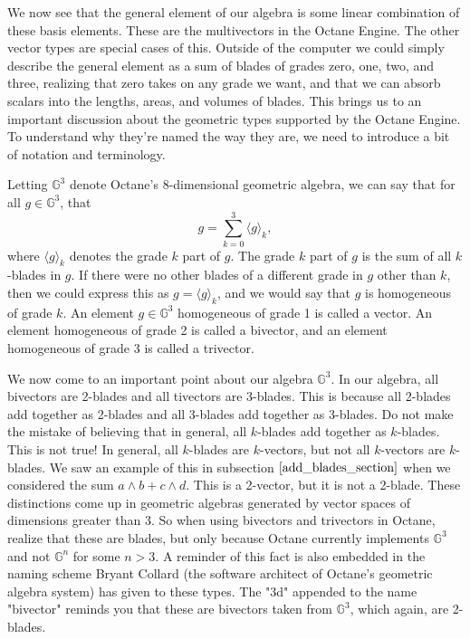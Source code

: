 \documentclass{article}
\newcommand{\G}{\mathbb{G}}
\begin{document}
We now see that the general element of our algebra is some linear combination
of these basis elements.  These are the multivectors in the Octane Engine.
The other vector types are special cases of this.
Outside of the computer we could simply describe the general element as
a sum of blades of grades zero, one, two, and three, realizing that zero takes
on any grade we want, and that we can absorb scalars into the lengths, areas,
and volumes of blades.  This brings us to an important discussion about the
geometric types supported by the Octane Engine.  To understand why they're named
the way they are, we need to introduce a bit of notation and terminology.

Letting $\G^3$ denote Octane's 8-dimensional geometric algebra, we can say
that for all $g\in\G^3$, that
\begin{equation*}
g = \sum_{k=0}^3\langle g\rangle_k,
\end{equation*}
where $\langle g\rangle_k$ denotes the grade $k$ part of $g$.
The grade $k$ part of $g$ is the sum of all $k$-blades in $g$.
If there were no other blades of a different grade in $g$ other than $k$,
then we could express this as $g=\langle g\rangle_k$, and we would say that
$g$ is homogeneous of grade $k$.  An element $g\in\G^3$ homogeneous of
grade 1 is called a vector.  An element homogeneous of grade 2 is called
a bivector, and an element homogeneous of grade 3 is called a trivector.

We now come to an important point about our algebra $\G^3$.  In our algebra,
all bivectors are 2-blades and all tivectors are 3-blades.  This is because
all 2-blades add together as 2-blades and all 3-blades add together as 3-blades.
Do not make the mistake of believing that in general, all $k$-blades add
together as $k$-blades.  This is not true!  In general, all $k$-blades are
$k$-vectors, but not all $k$-vectors are $k$-blades.  We saw an example of
this in subsection $\eqref{add_blades_section}$ when we considered the sum $a\wedge b+c\wedge d$.  This is
a 2-vector, but it is not a 2-blade.  These distinctions come up in geometric
algebras generated by vector spaces of dimensions greater than 3.  So when using
bivectors and trivectors in Octane, realize that these are blades, but only because
Octane currently implements $\G^3$ and not $\G^n$ for some $n>3$.  A reminder of
this fact is also embedded in the naming scheme Bryant Collard (the software architect
of Octane's geometric algebra system) has given to these types.
The "3d" appended to the name "bivector" reminds you that these are bivectors
taken from $\G^3$, which again, are 2-blades.
\end{document}
